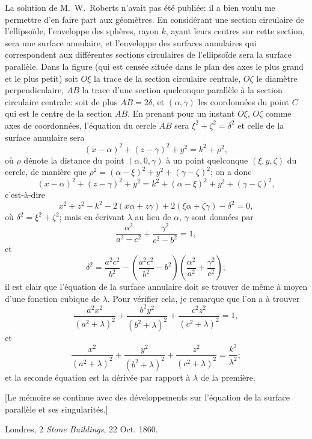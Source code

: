 \documentclass[11pt,a4paper]{article}
\theoremstyle{plain}
\theoremstyle{definition}
\begin{document}
La solution de M.~W.~Roberts n'avait pas \'{e}t\'{e} publi\'{e}e: il a bien voulu me permettre d'en faire part aux g\'{e}om\`{e}tres. En consid\'{e}rant une section circulaire de l'ellipso\"{i}de, l'enveloppe des sph\`{e}res, rayon $k$, ayant leurs centres sur cette section, sera une surface annulaire, et l'enveloppe des surfaces annulaires qui correspondent aux diff\'{e}rentes sections circulaires de l'ellipso\"{i}de sera la surface parall\`{e}le. Dans la figure (qui est cens\'{e}e situ\'{e}e dans le plan des axes le plus grand et le plus petit) soit $O\xi$ la trace de la section circulaire centrale, $O\zeta$ le diam\`{e}tre perpendiculaire, $AB$ la trace d'une section quelconque parall\`{e}le \`{a} la section circulaire centrale: soit de plus $AB = 2\delta$, et $(\alpha, \gamma)$ les coordonn\'{e}es du point $C$ qui est le centre de la section $AB$. En prenant pour un instant $O\xi$, $O\zeta$ comme axes de coordonn\'{e}es, l'\'{e}quation du cercle $AB$ sera $\xi^2 + \zeta^2 = \delta^2$ et celle de la surface annulaire sera
\[
(x-\alpha)^2 + (z-\gamma)^2 + y^2 = k^2 + \rho^2,
\]
o\`{u} $\rho$ d\'{e}note la distance du point $(\alpha, 0, \gamma)$ \`{a} un point quelconque $(\xi, y, \zeta)$ du cercle, de mani\`{e}re que $\rho^2 = (\alpha-\xi)^2 + y^2 + (\gamma-\zeta)^2$; on a donc
\[
(x-\alpha)^2 + (z-\gamma)^2 + y^2 = k^2 + (\alpha-\xi)^2 + y^2 + (\gamma-\zeta)^2,
\]
c'est-\`{a}-dire
\[
x^2 + z^2 - k^2 - 2(x\alpha + z\gamma) + 2(\xi\alpha + \zeta\gamma) - \delta^2 = 0,
\]
o\`{u} $\delta^2 = \xi^2 + \zeta^2$; mais en \'{e}crivant $\lambda$ au lieu de $\alpha$, $\gamma$ sont donn\'{e}es par
\[
\frac{\alpha^2}{a^2-c^2} + \frac{\gamma^2}{c^2-b^2} = 1,
\]
et
\[
\delta^2 = \frac{a^2c^2}{b^2} - \left(\frac{a^2c^2}{b^2} - b^2\right)\left(\frac{\alpha^2}{a^2} + \frac{\gamma^2}{c^2}\right);
\]
il est clair que l'\'{e}quation de la surface annulaire doit se trouver de m\^{e}me \`{a} moyen d'une fonction cubique de $\lambda$. Pour v\'{e}rifier cela, je remarque que l'on a \`{a} trouver
\[
\frac{a^2x^2}{(a^2+\lambda)^2} + \frac{b^2y^2}{(b^2+\lambda)^2} + \frac{c^2z^2}{(c^2+\lambda)^2} = 1,
\]
et
\[
\frac{x^2}{(a^2+\lambda)^2} + \frac{y^2}{(b^2+\lambda)^2} + \frac{z^2}{(c^2+\lambda)^2} = \frac{k^2}{\lambda^2};
\]
et la seconde \'{e}quation est la d\'{e}riv\'{e}e par rapport \`{a} $\lambda$ de la premi\`{e}re.

[Le m\'{e}moire se continue avec des d\'{e}veloppements sur l'\'{e}quation de la surface parall\`{e}le et ses singularit\'{e}s.]

\begin{flushright}
Londres, 2 \textit{Stone Buildings}, 22 Oct. 1860.
\end{flushright}
\end{document}
